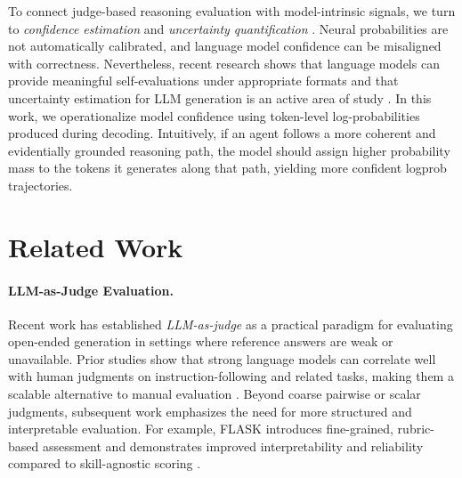\documentclass[11pt]{article}
\begin{document}
To connect judge-based reasoning evaluation with model-intrinsic signals, we turn to \emph{confidence estimation} and \emph{uncertainty quantification} \cite{kang2025scalable}. Neural probabilities are not automatically calibrated, and language model confidence can be misaligned with correctness. Nevertheless, recent research shows that language models can provide meaningful self-evaluations under appropriate formats and that uncertainty estimation for LLM generation is an active area of study \cite{mavi2025selfevaluatingllmsmultisteptasks}. In this work, we operationalize model confidence using token-level log-probabilities produced during decoding. Intuitively, if an agent follows a more coherent and evidentially grounded reasoning path, the model should assign higher probability mass to the tokens it generates along that path, yielding more confident logprob trajectories.


\section{Related Work}

\paragraph{LLM-as-Judge Evaluation.}
Recent work has established \emph{LLM-as-judge} as a practical paradigm for evaluating open-ended generation in settings where reference answers are weak or unavailable. Prior studies show that strong language models can correlate well with human judgments on instruction-following and related tasks, making them a scalable alternative to manual evaluation \cite{chiang2023can, li2023alpacaeval, zheng2023judging, fu2023gptscore, liu2023geval}. Beyond coarse pairwise or scalar judgments, subsequent work emphasizes the need for more structured and interpretable evaluation. For example, FLASK introduces fine-grained, rubric-based assessment and demonstrates improved interpretability and reliability compared to skill-agnostic scoring \cite{ye2024flask}. 
\end{document}
